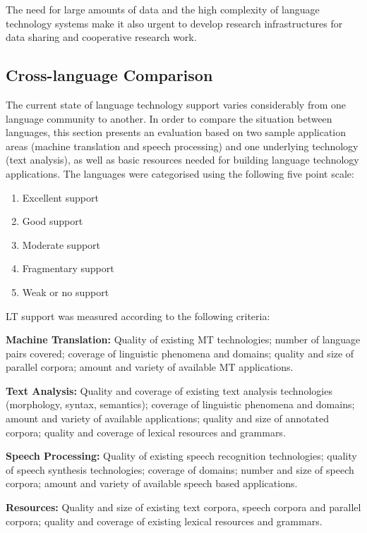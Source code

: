 \begin{multicols}{2}
The need for large amounts of data and the high complexity of language technology systems make it also urgent to develop research 
infrastructures for data sharing and cooperative research work.





\subsection{Cross-language Comparison}


The current state of language technology support varies considerably from one language community to another. 
In order to compare the situation between languages, this section presents an evaluation based on two sample application 
areas (machine translation and speech processing) and one underlying technology (text analysis), as well as basic resources 
needed for building language technology applications. The languages were categorised using the following five point scale: 

\begin{enumerate}
\item Excellent support
\item Good support
\item Moderate support
\item Fragmentary support
\item Weak or no support
\end{enumerate}

LT support was measured according to the following criteria:

\textbf{Machine Translation:} Quality of existing MT technologies; number of language pairs covered; coverage of linguistic phenomena and domains; quality and size of parallel corpora; amount and variety of available MT applications.

\textbf{Text Analysis:} Quality and coverage of existing text analysis technologies (morphology, syntax, semantics); coverage of linguistic phenomena and domains; amount and variety of available applications; quality and size of annotated corpora; quality and coverage of lexical resources and grammars.

\textbf{Speech Processing:} Quality of existing speech recognition technologies; quality of speech synthesis technologies; coverage of domains; number and size of speech corpora; amount and variety of available speech based applications.

\textbf{Resources:} Quality and size of existing text corpora, speech corpora and parallel corpora; quality and coverage of existing lexical resources and grammars.




\end{multicols}
